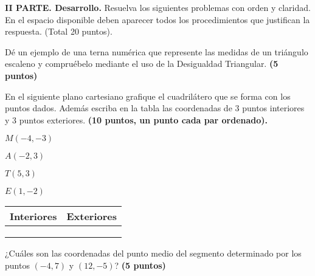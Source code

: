 \documentclass[12pt, fleqn]{article}
\begin{document}
{\bf II PARTE. Desarrollo.} Resuelva los siguientes problemas con orden y claridad. En el espacio disponible deben aparecer todos los procedimientos que justifican la respuesta. (Total 20 puntos). \vs\vs

\benu
\item Dé un ejemplo de una terna numérica que represente las medidas de un triángulo escaleno y compruébelo mediante el uso de la Desigualdad Triangular. \hfill{\bf (5 puntos)}

\pagebreak

\item En el siguiente plano cartesiano grafique el cuadrilátero que se forma con los puntos dados. Además escriba en la tabla las coordenadas de 3 puntos interiores y 3 puntos exteriores. {\bf (10 puntos, un punto cada par ordenado).}
\vp

\begin{multicols}{2}
\benu
\item $M(-4,-3)$
\item $A(-2,3)$
\item $T(5,3)$
\item $E(1,-2)$
\eenu

\begin{tabular}{|c|c|}
\hline
\bf Interiores & \bf Exteriores \\
    \hline
    & \\
    \hline
    & \\
    \hline
    & \\
    \hline
\end{tabular}

\end{multicols}


\bc
{}
\ec
\vs\vs

\item ¿Cuáles son las coordenadas del punto medio del segmento determinado por los puntos $(-4,7)$ y $(12,-5)$? \hfill{\bf (5 puntos)} \vs\vs\vs\vs\vs\vs\vs\vs\vs


\eenu
\end{document}
